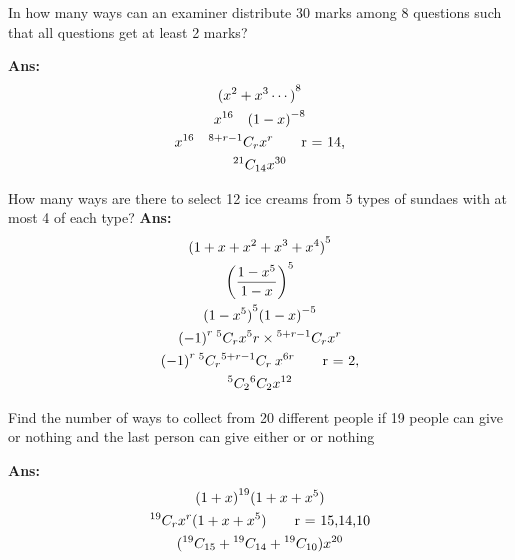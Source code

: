 \begin{example}
    In how many ways can an examiner distribute 30 marks among 8 questions such that all questions get at least 2 marks?

    \textbf{Ans:}
    \begin{gather*}
        {(x^2 + x^3 \cdots)}^8 \\
        x^{16}\quad {(1 - x)}^{-8}\\
        x^{16}\quad{}^{8 + r - 1}C_{r} x^r  \tag*{r = 14,} \\
        {}^{21}C_{14} x^{30}
    \end{gather*}
\end{example}
\begin{example}
    How many ways are there to select 12 ice creams from 5 types of sundaes with at most 4 of each type?
    \textbf{Ans:}
    \begin{gather*}
        {(1 + x + x^2 + x^3 + x^4 )}^5 \\
        {\left(\frac{1 - x^5}{1 - x}\right)}^5 \\
        {(1 - x^5)}^5 {(1 - x)}^{-5}\\
        {( - 1)}^r\: {}^{5}C_{r} x^5r \times {}^{5 + r - 1}C_{r} x^r \\
        {( - 1)}^r\: {}^{5}C_{r} {}^{5 + r - 1}C_{r}\: x^{6r} \tag*{r = 2,} \\
        {}^{5}C_{2} {}^{6}C_{2} x^{12}
    \end{gather*}
\end{example}

\begin{example}
    Find the number of ways to collect  from 20 different people if 19 people can give  or nothing and the last person can give either  or  or nothing

    \textbf{Ans:}\begin{gather*}
        {(1 + x)}^{19} {(1 + x + x^5)}\\
        {}^{19}C_{r} x^r {(1 + x + x^5)} \tag*{r = 15,14,10}\\
        {({}^{19}C_{15} + {}^{19}C_{14} +{}^{19}C_{10})} x^{20}
    \end{gather*}
\end{example}


